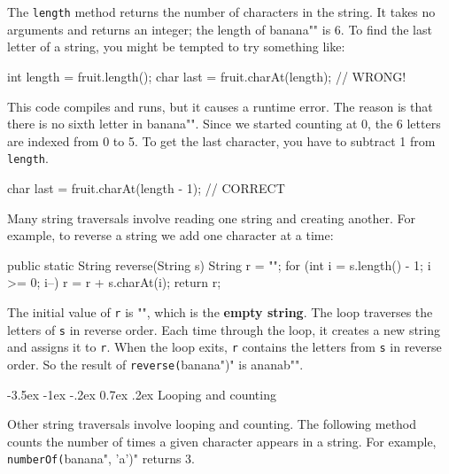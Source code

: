 \documentclass[12pt]{book}
\makeatletter
\theoremstyle{exercise}
\newcommand{\java}[1]{\verb"#1"}
\renewcommand{\section}{\@startsection{section}{1}{\z@}%
    {-3.5ex \@plus -1ex \@minus -.2ex}%
    {0.7ex \@plus.2ex}%
    {\normalfont\Large\bfseries}}
\newcommand{\java}[1]{\lstinline{#1}} %
\makeatother
\begin{document}

The \java{length} method returns the number of characters in the string.
It takes no arguments and returns an integer; the length of \java{"banana"} is 6.
To find the last letter of a string, you might be tempted to try something like:

\begin{code}
    int length = fruit.length();
    char last = fruit.charAt(length);      // WRONG!
\end{code}

This code compiles and runs, but it causes a runtime error.
The reason is that there is no sixth letter in \java{"banana"}.
Since we started counting at 0, the 6 letters are indexed from 0 to 5.
To get the last character, you have to subtract 1 from \java{length}.

\begin{code}
    char last = fruit.charAt(length - 1);  // CORRECT
\end{code}

Many string traversals involve reading one string and creating another.
For example, to reverse a string we add one character at a time:

\begin{code}
    public static String reverse(String s) {
        String r = "";
        for (int i = s.length() - 1; i >= 0; i--) {
            r = r + s.charAt(i);
        }
        return r;
    }
\end{code}


The initial value of \java{r} is \java{""}, which is the {\bf empty string}.
The loop traverses the letters of \java{s} in reverse order.
Each time through the loop, it creates a new string and assigns it to \java{r}.
When the loop exits, \java{r} contains the letters from \java{s} in reverse order.
So the result of \java{reverse("banana")} is \java{"ananab"}.

\section{Looping and counting}
\label{loopcount}


Other string traversals involve looping and counting.
The following method counts the number of times a given character appears in a string.
For example, \java{numberOf("banana", 'a')} returns 3.
\end{document}

